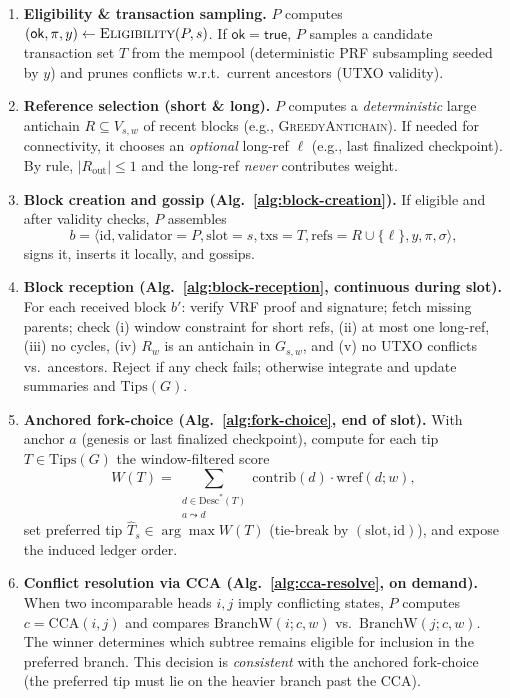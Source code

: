 \documentclass[11pt]{article}
\newcommand{\id}{\ensuremath{\mathrm{id}}\xspace}
\newcommand{\val}{\ensuremath{\mathrm{validator}}\xspace}
\newcommand{\slot}{\ensuremath{\mathrm{slot}}\xspace}
\newcommand{\txs}{\ensuremath{\mathrm{txs}}\xspace}
\newcommand{\refs}{\ensuremath{\mathrm{refs}}\xspace}
\newcommand{\Desc}{\ensuremath{\mathrm{Desc}}\xspace}
\newcommand{\Tips}{\ensuremath{\mathrm{Tips}}\xspace}
\newcommand{\Eligibility}{\ensuremath{\textsc{Eligibility}}\xspace}
\newcommand{\GreedyAntichain}{\textsc{GreedyAntichain}\xspace}
\newcommand{\wref}{\ensuremath{\mathrm{wref}}\xspace}
\newcommand{\BranchW}{\ensuremath{\mathrm{BranchW}}\xspace}
\newcommand{\CCA}{\ensuremath{\mathrm{CCA}}\xspace}
\begin{document}
\begin{enumerate}
  \item \textbf{Eligibility \& transaction sampling.}
  $P$ computes $(\mathsf{ok},\pi,y)\leftarrow\Eligibility(P,s)$. If $\mathsf{ok}=\textsf{true}$, $P$ samples a candidate transaction set $T$ from the mempool (deterministic PRF subsampling seeded by $y$) and prunes conflicts w.r.t.\ current ancestors (UTXO validity).

  \item \textbf{Reference selection (short \& long).}
  $P$ computes a \emph{deterministic} large antichain $R\subseteq V_{s,w}$ of recent blocks (e.g., \GreedyAntichain). If needed for connectivity, it chooses an \emph{optional} long-ref $\ell$ (e.g., last finalized checkpoint). By rule, $|R_{\text{out}}|\le1$ and the long-ref \emph{never} contributes weight.

  \item \textbf{Block creation and gossip (Alg.~\ref{alg:block-creation}).}
  If eligible and after validity checks, $P$ assembles
  \[
  b=\langle
\id,\val{=}P,\slot{=}s,\txs{=}T,\refs{=}R\cup\{\ell\},y,\pi,\sigma\rangle,
  \]
  signs it, inserts it locally, and gossips.

  \item \textbf{Block reception (Alg.~\ref{alg:block-reception}, continuous during slot).}
  For each received block $b'$: verify VRF proof and signature; fetch missing parents; check (i) window constraint for short refs, (ii) at most one long-ref, (iii) no cycles, (iv) $R_w$ is an antichain in $G_{s,w}$, and (v) no UTXO conflicts vs.\ ancestors. Reject if any check fails; otherwise integrate and update summaries and $\Tips(G)$.

  \item \textbf{Anchored fork-choice (Alg.~\ref{alg:fork-choice}, end of slot).}
  With anchor $a$ (genesis or last finalized checkpoint), compute for each tip $T\in\Tips(G)$ the window-filtered score
  \[
  W(T)=\sum_{\substack{d\in\Desc^*(T)\\a\leadsto d}}\mathrm{contrib}(d)\cdot \wref(d;w),
  \]
  set preferred tip $\hat T_s\in\arg\max W(T)$ (tie-break by $(\slot,\id)$), and expose the induced ledger order.

  \item \textbf{Conflict resolution via CCA (Alg.~\ref{alg:cca-resolve}, on demand).}
  When two incomparable heads $i,j$ imply conflicting states, $P$ computes $c=\CCA(i,j)$ and compares $\BranchW(i;c,w)$ vs.\ $\BranchW(j;c,w)$. The winner determines which subtree remains eligible for inclusion in the preferred branch. This decision is \emph{consistent} with the anchored fork-choice (the preferred tip must lie on the heavier branch past the CCA).
\end{enumerate}
\end{document}
